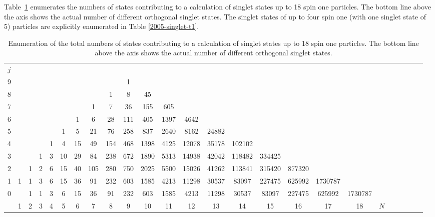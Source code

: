 \documentclass[rmp,amsfonts,showpacs,showkeys,preprint]{revtex4}
\begin{document}
Table~\ref{2008-sg-tso-numbers} enumerates the numbers of states contributing to a calculation of singlet states up to 18 spin one particles.
The bottom line above the axis shows the actual number of different orthogonal singlet states.
The singlet states of up to four spin one (with one singlet state of 5) particles are explicitly enumerated in Table \ref{2005-singlet-t1}.
\begin{table}
\begin{center}
\begin{tabular}{c|cccccccccccccccccccccccc}
\multicolumn{1}{c}{$j$}\\
9                   &    &  &  &  &  &  &  &  & 1 &  &  &  &  &  &  &  &  &  \\
8                   &    &  &  &  &  &  &  & 1 & 8 & 45 &  &  &  &  &  &  &  &  \\
7                   &    &  &  &  &  &  & 1 & 7 & 36 & 155 & 605 &  &  &  &  &  &  &  \\
6                   &    &  &  &  &  & 1 & 6 & 28 & 111 & 405 & 1397 & 4642 &  &  &  &  &  &  \\
5                   &    &  &  &  & 1 & 5 & 21 & 76 & 258 & 837 & 2640 & 8162 & 24882 &  &  &  &  &  \\
4                   &    &  &  & 1 & 4 & 15 & 49 & 154 & 468 & 1398 & 4125 & 12078 & 35178 & 102102 &  &  &  &  \\
3                   &    &  & 1 & 3 & 10 & 29 & 84 & 238 & 672 & 1890 & 5313 & 14938 & 42042 & 118482 & 334425 &  &  &  \\
2                   &    & 1 & 2 & 6 & 15 & 40 & 105 & 280 & 750 & 2025 & 5500 & 15026 & 41262 & 113841 & 315420 & 877320 &  &  \\
1                   &  1 & 1 & 3 & 6 & 15 & 36 & 91 & 232 & 603 & 1585 & 4213 & 11298 & 30537 & 83097 & 227475 & 625992 & 1730787 &  \\
0                   &    & 1 & 1 & 3 & 6 & 15 & 36 & 91 & 232 & 603 & 1585 & 4213 & 11298 & 30537 & 83097 & 227475 & 625992 & 1730787  \\
\cline{2-19}
\multicolumn{1}{c}{ }&1&2&3&4&5&6&7&8&9&10&11&12&13&14&15&16&17&18 &$N$
\end{tabular}
\end{center}
\caption{\label{2008-sg-tso-numbers} Enumeration of the total numbers of states contributing to a calculation of singlet states up to 18 spin one particles.
The bottom line above the axis shows the actual number of different orthogonal singlet states.}
\end{table}
\end{document}
